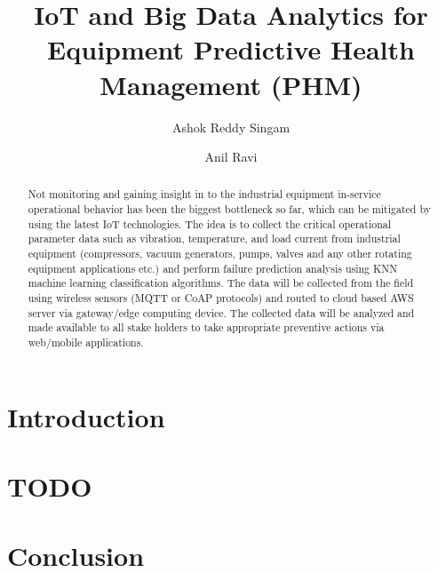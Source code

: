 \documentclass[sigconf]{acmart}
\begin{document}
\title{IoT and Big Data Analytics for Equipment Predictive Health
       Management (PHM)}

\author{Ashok Reddy Singam}

\author{Anil Ravi}

\begin{abstract}
Not monitoring and gaining insight in to the industrial equipment in-service operational behavior has been the biggest bottleneck so far, which can be mitigated by using the latest IoT technologies. The idea is to collect the critical operational parameter data such as vibration, temperature, and load current from industrial equipment (compressors, vacuum generators, pumps, valves and any other rotating equipment applications etc.) and perform failure prediction analysis using KNN machine learning classification algorithms. The data will be collected from the field using wireless sensors (MQTT or CoAP protocols) and routed to cloud based AWS server via gateway/edge computing device. The collected data will be analyzed and made available to all stake holders to take appropriate preventive actions via web/mobile applications.

\end{abstract}


\maketitle

\section{Introduction}

\section{TODO}

\section{Conclusion}
\end{document}
